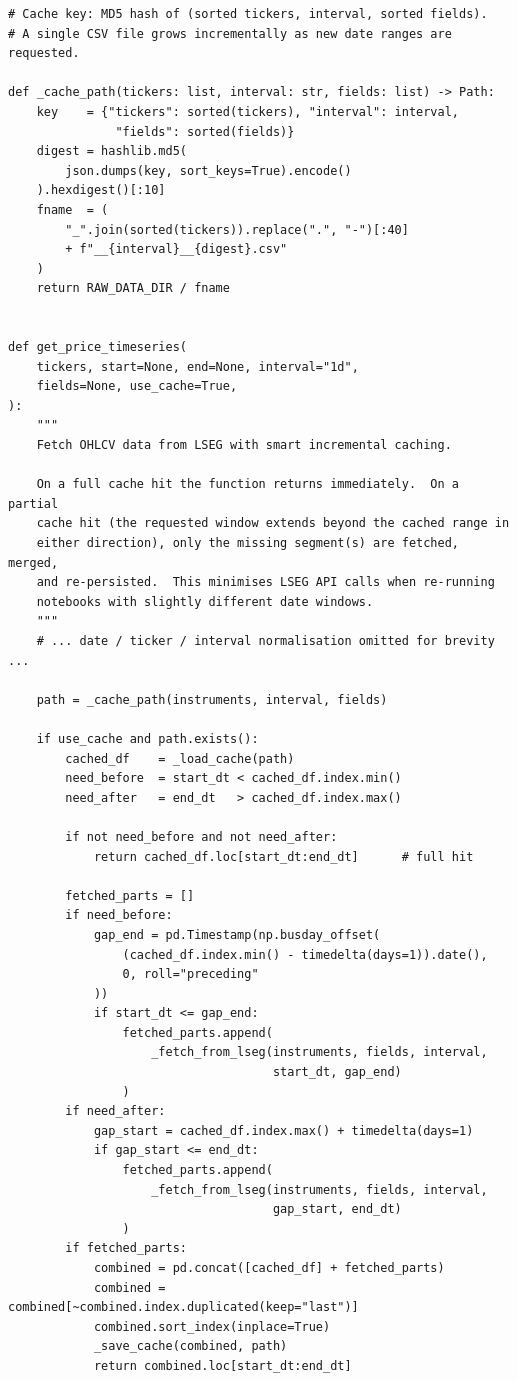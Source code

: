 \documentclass[a4paper]{report}
\begin{document}
\begin{Verbatim}[fontsize=\footnotesize, baselinestretch=0.85]
# Cache key: MD5 hash of (sorted tickers, interval, sorted fields).
# A single CSV file grows incrementally as new date ranges are requested.

def _cache_path(tickers: list, interval: str, fields: list) -> Path:
    key    = {"tickers": sorted(tickers), "interval": interval,
               "fields": sorted(fields)}
    digest = hashlib.md5(
        json.dumps(key, sort_keys=True).encode()
    ).hexdigest()[:10]
    fname  = (
        "_".join(sorted(tickers)).replace(".", "-")[:40]
        + f"__{interval}__{digest}.csv"
    )
    return RAW_DATA_DIR / fname


def get_price_timeseries(
    tickers, start=None, end=None, interval="1d",
    fields=None, use_cache=True,
):
    """
    Fetch OHLCV data from LSEG with smart incremental caching.

    On a full cache hit the function returns immediately.  On a partial
    cache hit (the requested window extends beyond the cached range in
    either direction), only the missing segment(s) are fetched, merged,
    and re-persisted.  This minimises LSEG API calls when re-running
    notebooks with slightly different date windows.
    """
    # ... date / ticker / interval normalisation omitted for brevity ...

    path = _cache_path(instruments, interval, fields)

    if use_cache and path.exists():
        cached_df    = _load_cache(path)
        need_before  = start_dt < cached_df.index.min()
        need_after   = end_dt   > cached_df.index.max()

        if not need_before and not need_after:
            return cached_df.loc[start_dt:end_dt]      # full hit

        fetched_parts = []
        if need_before:
            gap_end = pd.Timestamp(np.busday_offset(
                (cached_df.index.min() - timedelta(days=1)).date(),
                0, roll="preceding"
            ))
            if start_dt <= gap_end:
                fetched_parts.append(
                    _fetch_from_lseg(instruments, fields, interval,
                                     start_dt, gap_end)
                )
        if need_after:
            gap_start = cached_df.index.max() + timedelta(days=1)
            if gap_start <= end_dt:
                fetched_parts.append(
                    _fetch_from_lseg(instruments, fields, interval,
                                     gap_start, end_dt)
                )
        if fetched_parts:
            combined = pd.concat([cached_df] + fetched_parts)
            combined = combined[~combined.index.duplicated(keep="last")]
            combined.sort_index(inplace=True)
            _save_cache(combined, path)
            return combined.loc[start_dt:end_dt]


\end{Verbatim}
\end{document}

